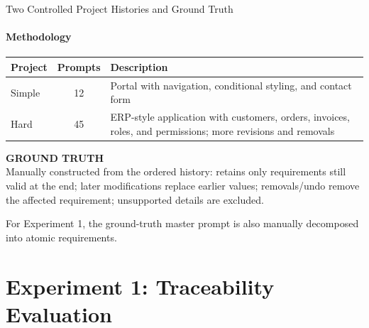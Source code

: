 \documentclass[aspectratio=169,11pt,c]{beamer}
\newcommand{\calllbl}[1]{{\footnotesize\bfseries\color{primaryblue}\MakeUppercase{#1}}\\[2pt]}
\begin{document}
\begin{frame}{Two Controlled Project Histories and Ground Truth}
  \framesubtitle{Methodology}
  \begin{center}\scriptsize
  \begin{tabular}{lcp{7.4cm}}
    \toprule
    \textbf{Project} & \textbf{Prompts} & \textbf{Description} \\
    \midrule
    Simple & 12 & Portal with navigation, conditional styling, and contact form \\
    \addlinespace[3pt]
    Hard & 45 & ERP-style application with customers, orders, invoices, roles, and permissions; more revisions and removals \\
    \bottomrule
  \end{tabular}
  \end{center}
  \vspace{2pt}
  \begin{calloutbox}
    \scriptsize\calllbl{Ground truth}Manually constructed from the ordered history: retains only requirements still valid at the end; later modifications replace earlier values; removals/undo remove the affected requirement; unsupported details are excluded.
  \end{calloutbox}
  \vspace{2pt}
  {\small\color{midgray}\centering For Experiment 1, the ground-truth master prompt is also manually decomposed into atomic requirements.\par}
\end{frame}

\section{Experiment 1: Traceability Evaluation}
\end{document}
